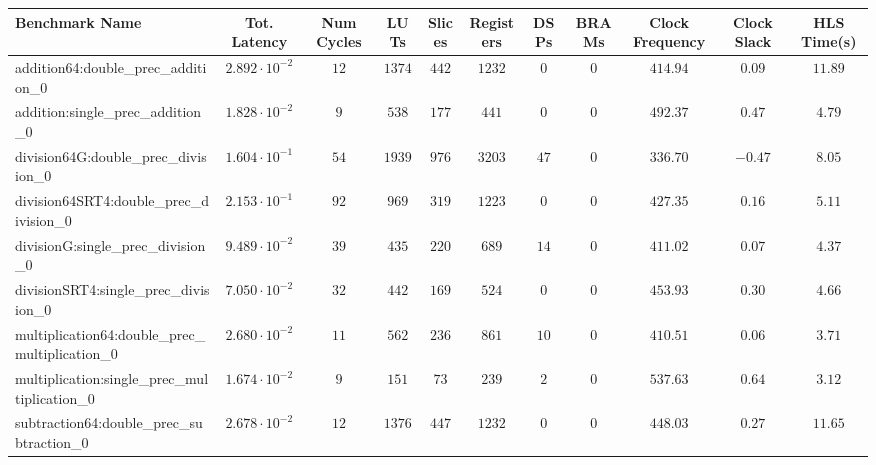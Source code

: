 \begin{tabular}{|l|c|c|c|c|c|c|c|c|c|c|}
\hline
Benchmark Name                                   & Tot. Latency            & Num Cycles & LUTs     & Slices   & Registers & DSPs   & BRAMs & Clock Frequency & Clock Slack & HLS Time(s) \\
\hline
addition64:double\_prec\_addition\_0             & $ 2.892 \cdot 10^{-2} $ & $ 12     $ & $ 1374 $ & $ 442  $ & $ 1232  $ & $ 0  $ & $ 0 $ & $ 414.94      $ & $ 0.09    $ & $ 11.89   $ \\
addition:single\_prec\_addition\_0               & $ 1.828 \cdot 10^{-2} $ & $ 9      $ & $ 538  $ & $ 177  $ & $ 441   $ & $ 0  $ & $ 0 $ & $ 492.37      $ & $ 0.47    $ & $ 4.79    $ \\
division64G:double\_prec\_division\_0            & $ 1.604 \cdot 10^{-1} $ & $ 54     $ & $ 1939 $ & $ 976  $ & $ 3203  $ & $ 47 $ & $ 0 $ & $ 336.70      $ & $ -0.47   $ & $ 8.05    $ \\
division64SRT4:double\_prec\_division\_0         & $ 2.153 \cdot 10^{-1} $ & $ 92     $ & $ 969  $ & $ 319  $ & $ 1223  $ & $ 0  $ & $ 0 $ & $ 427.35      $ & $ 0.16    $ & $ 5.11    $ \\
divisionG:single\_prec\_division\_0              & $ 9.489 \cdot 10^{-2} $ & $ 39     $ & $ 435  $ & $ 220  $ & $ 689   $ & $ 14 $ & $ 0 $ & $ 411.02      $ & $ 0.07    $ & $ 4.37    $ \\
divisionSRT4:single\_prec\_division\_0           & $ 7.050 \cdot 10^{-2} $ & $ 32     $ & $ 442  $ & $ 169  $ & $ 524   $ & $ 0  $ & $ 0 $ & $ 453.93      $ & $ 0.30    $ & $ 4.66    $ \\
multiplication64:double\_prec\_multiplication\_0 & $ 2.680 \cdot 10^{-2} $ & $ 11     $ & $ 562  $ & $ 236  $ & $ 861   $ & $ 10 $ & $ 0 $ & $ 410.51      $ & $ 0.06    $ & $ 3.71    $ \\
multiplication:single\_prec\_multiplication\_0   & $ 1.674 \cdot 10^{-2} $ & $ 9      $ & $ 151  $ & $ 73   $ & $ 239   $ & $ 2  $ & $ 0 $ & $ 537.63      $ & $ 0.64    $ & $ 3.12    $ \\
subtraction64:double\_prec\_subtraction\_0       & $ 2.678 \cdot 10^{-2} $ & $ 12     $ & $ 1376 $ & $ 447  $ & $ 1232  $ & $ 0  $ & $ 0 $ & $ 448.03      $ & $ 0.27    $ & $ 11.65   $ \\

\end{tabular}
